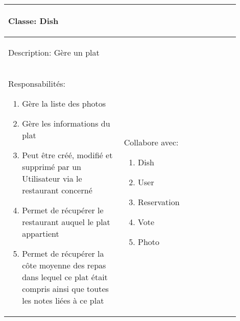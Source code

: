 \documentclass[10pt,a4paper]{article}
\begin{document}
\begin{tabular}{|p{0.45\linewidth}|p{0.45\linewidth}|}
  \hline
  \multicolumn{2}{|l|}{\begin{large}
  	Classe: Dish
  \end{large}}\\
  \hline
  \multicolumn{2}{|l|}{\begin{normalsize}
  	Description: Gère un plat
  \end{normalsize}}\\[0.05\linewidth]
  \hline
  \begin{normalsize}
  	Responsabilités:
  	\begin{enumerate}
  		\item Gère la liste des photos
  		\item Gère les informations du plat
  		\item Peut être créé, modifié et supprimé par un Utilisateur via le restaurant concerné
  		\item Permet de récupérer le restaurant auquel le plat appartient
  		\item Permet de récupérer la côte moyenne des repas dans lequel ce plat était compris ainsi que toutes les notes liées à ce plat
  	\end{enumerate}
  \end{normalsize} & 
  \begin{normalsize}{
  	Collabore avec:
  	\begin{enumerate}
  		\item Dish
    		\item User
    		\item Reservation
    		\item Vote
    		\item Photo
  	\end{enumerate}
  }\end{normalsize}\\[0.6\linewidth]
  \hline
\end{tabular}
\end{document}
